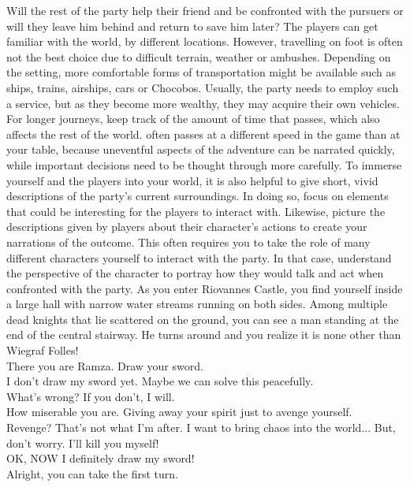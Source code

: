 Will the rest of the party help their friend and be confronted with the pursuers or will they leave him behind and return to save him later?
%
\ofpar
%
The players can get familiar with the world, by  different locations.
However, travelling on foot is often not the best choice due to difficult terrain, weather or ambushes.
Depending on the setting, more comfortable forms of transportation might be available such as ships, trains, airships, cars or Chocobos.
Usually, the party needs to employ such a service, but as they become more wealthy, they may acquire their own vehicles.
For longer journeys, keep track of the amount of time that passes, which also affects the rest of the world.
 often passes at a different speed in the game than at your table, because uneventful aspects of the adventure can be narrated quickly, while important decisions need to be thought through more carefully.
To immerse yourself and the players into your world, it is also helpful to give short, vivid descriptions of the party's current surroundings.
In doing so, focus on elements that could be interesting for the players to interact with.
Likewise, picture the descriptions given by players about their character's actions to create your narrations of the outcome.
This often requires you to take the role of many different characters yourself to interact with the party.
In that case, understand the perspective of the character to portray how they would talk and act when confronted with the party.
%
\ofpar
%
{
	As you enter Riovannes Castle, you find yourself inside a large hall with narrow water streams running on both sides.
	Among multiple dead knights that lie scattered on the ground, you can see a man standing at the end of the central stairway.
	He turns around and you realize it is none other than Wiegraf Folles! \vspace{0.25cm}\\
	 There you are Ramza. Draw your sword. \vspace{0.25cm}\\			
	 I don't draw my sword yet. Maybe we can solve this peacefully. \vspace{0.25cm}\\	
	 What's wrong? If you don't, I will. \vspace{0.25cm}\\			
	 How miserable you are. Giving away your spirit just to avenge yourself. \vspace{0.25cm}\\
	 Revenge? That's not what I'm after.
	I want to bring chaos into the world... But, don't worry. I'll kill you myself! \vspace{0.25cm}\\			
	 OK, NOW I definitely draw my sword! \vspace{0.25cm}\\
	 Alright, you can take the first turn.
}

